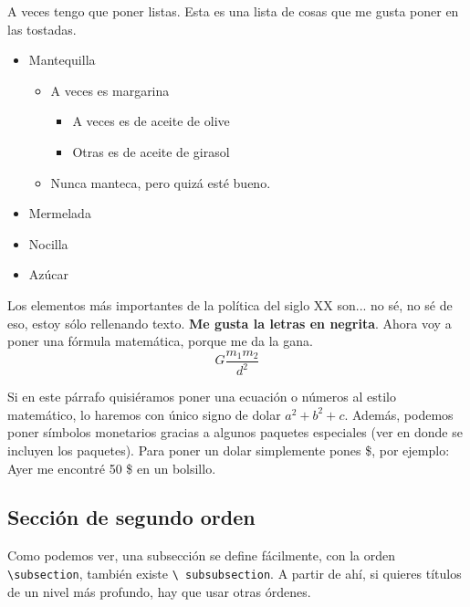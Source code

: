 \documentclass{article}
\begin{document}
A veces tengo que poner listas.
Esta es una lista de cosas que me gusta poner en las tostadas.
\begin{itemize}
    \item Mantequilla
    \begin{itemize}
        \item A veces es margarina
        \begin{itemize}
            \item A veces es de aceite de olive
            \item Otras es de aceite de girasol
        \end{itemize}
        \item Nunca manteca, pero quizá esté bueno.
    \end{itemize}
    \item Mermelada
    \item Nocilla
    \item Azúcar
\end{itemize}


Los elementos más importantes de la política del siglo XX son... no sé, no sé
de eso, estoy sólo rellenando texto. \textbf{Me gusta la letras en negrita}.
Ahora voy a poner una fórmula matemática, porque me da la gana.
$$
G\frac{m_1 m_2}{d^2}
$$

Si en este párrafo quisiéramos poner una ecuación o números al estilo 
matemático, lo haremos con único signo de dolar $a^2+b^2+c$. 
Además, podemos poner símbolos monetarios gracias a algunos paquetes especiales
(ver en donde se incluyen los paquetes).  Para poner un dolar
simplemente pones \$, por ejemplo: Ayer me encontré 50 \$ en un bolsillo.

\subsection{Sección de segundo orden}

Como podemos ver, una subsección se define fácilmente, con la orden
\texttt{\textbackslash subsection}, también existe \texttt{\textbackslash
subsubsection}. A partir de ahí, si quieres títulos de un nivel más profundo,
hay que usar otras órdenes.
\end{document}
